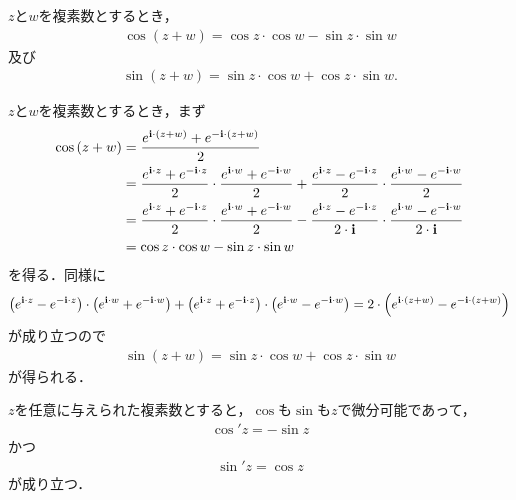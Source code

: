 	\begin{screen}
		\begin{thm}[加法定理]\label{thm:addition_theorem_for_trigonometric_functions}
			$z$と$w$を複素数とするとき，
			\begin{align}
				\cos{(z + w)} = \cos{z} \cdot \cos{w} - \sin{z} \cdot \sin{w}
			\end{align}
			及び
			\begin{align}
				\sin{(z + w)} = \sin{z} \cdot \cos{w} + \cos{z} \cdot \sin{w}.
			\end{align}
		\end{thm}
	\end{screen}
	
	\begin{sketch}
		$z$と$w$を複素数とするとき，まず
		\begin{align}
			\cos{(z+w)} &= \frac{e^{\mathbf{i} \cdot (z+w)} + e^{-\mathbf{i} \cdot (z+w)}}{2} \\
			&= \frac{e^{\mathbf{i} \cdot z} + e^{-\mathbf{i} \cdot z}}{2} 
			\cdot \frac{e^{\mathbf{i} \cdot w} + e^{-\mathbf{i} \cdot w}}{2}
			+ \frac{e^{\mathbf{i} \cdot z} - e^{-\mathbf{i} \cdot z}}{2} 
			\cdot \frac{e^{\mathbf{i} \cdot w} - e^{-\mathbf{i} \cdot w}}{2} \\
			&= \frac{e^{\mathbf{i} \cdot z} + e^{-\mathbf{i} \cdot z}}{2} 
			\cdot \frac{e^{\mathbf{i} \cdot w} + e^{-\mathbf{i} \cdot w}}{2}
			- \frac{e^{\mathbf{i} \cdot z} - e^{-\mathbf{i} \cdot z}}{2 \cdot \mathbf{i}} 
			\cdot \frac{e^{\mathbf{i} \cdot w} - e^{-\mathbf{i} \cdot w}}{2 \cdot \mathbf{i}} \\
			&= \cos{z} \cdot \cos{w} - \sin{z} \cdot \sin{w}
		\end{align}
		を得る．同様に
		\begin{align}
			\left(e^{\mathbf{i} \cdot z} - e^{-\mathbf{i} \cdot z}\right) \cdot \left(e^{\mathbf{i} \cdot w} + e^{-\mathbf{i} \cdot w}\right)
			+ \left(e^{\mathbf{i} \cdot z} + e^{-\mathbf{i} \cdot z}\right) \cdot \left(e^{\mathbf{i} \cdot w} - e^{-\mathbf{i} \cdot w}\right)
			= 2 \cdot \left(e^{\mathbf{i} \cdot (z+w)} - e^{-\mathbf{i} \cdot (z+w)}\right)
		\end{align}
		が成り立つので
		\begin{align}
			\sin{(z+w)} = \sin{z} \cdot \cos{w} + \cos{z} \cdot \sin{w}
		\end{align}
		が得られる．
		\QED
	\end{sketch}
	
	\begin{screen}
		\begin{thm}
		\label{thm:derivatives_of_trigonometric_functions}
			$z$を任意に与えられた複素数とすると，$\cos$も$\sin$も$z$で微分可能であって，
			\begin{align}
				\cos'{z} = - \sin{z}
			\end{align}
			かつ
			\begin{align}
				\sin'{z} = \cos{z}
			\end{align}
			が成り立つ．
		\end{thm}
	\end{screen}
	

